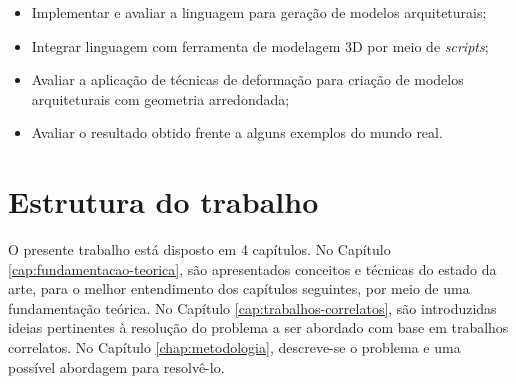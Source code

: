 \begin{itemize}
    \item Implementar e avaliar a linguagem para geração de modelos arquiteturais;
    \item Integrar linguagem com ferramenta de modelagem 3D por meio de \textit{scripts};
    \item Avaliar a aplicação de técnicas de deformação para criação de modelos arquiteturais com geometria arredondada;
    \item Avaliar o resultado obtido frente a alguns exemplos do mundo real.
\end{itemize}

\section{Estrutura do trabalho}
\label{sec:estrutura_trabalho}

O presente trabalho está disposto em 4 capítulos. No Capítulo \ref{cap:fundamentacao-teorica}, são apresentados conceitos e técnicas do estado da arte, para o melhor entendimento dos capítulos seguintes, por meio de uma fundamentação teórica. No Capítulo \ref{cap:trabalhos-correlatos}, são introduzidas ideias pertinentes à resolução do problema a ser abordado com base em trabalhos correlatos. No Capítulo \ref{chap:metodologia}, descreve-se o problema e uma possível abordagem para resolvê-lo.